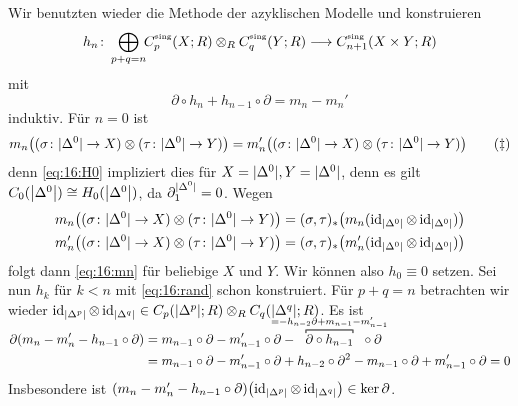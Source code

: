 \begin{beweis}
	Wir benutzten wieder die Methode der azyklischen Modelle und konstruieren
	\[
		h_n \colon \bigoplus_{p+q=n}\!\! C^\sing_p(X;R) \otimes_R C^\sing_q(Y;R) \longrightarrow C_{n+1}^\sing(X \times Y;R)
	\]
	mit 
	\begin{equation}
		\partial \circ h_n + h_{n-1} \circ \partial=m_n -m_n' \label{eq:16:rand} \tag{\#}
	\end{equation}
	induktiv. Für $n=0$ ist 
	\begin{equation}
		m_n \enbrace[\big]{(\sigma \colon \abs{\Delta^0} \to X) \otimes (\tau \colon \abs{\Delta^0} \to Y ) } = m_n' \enbrace[\big]{(\sigma \colon \abs{\Delta^0} \to X) \otimes (\tau \colon \abs{\Delta^0} \to Y)} \label{eq:16:mn}\tag{\ddag}
	\end{equation}
	denn \eqref{eq:16:H0} impliziert dies für $X=\abs{\Delta^0}, Y=\abs{\Delta^0}$, denn es gilt $C_0(\abs*{\Delta^0})\cong H_0(\abs*{\Delta^0})$, da $\partial_1^{\abs{\Delta^0} }=0$. Wegen
	\begin{align}
		m_n \enbrace[\big]{(\sigma \colon \abs{\Delta^0} \to X) \otimes (\tau \colon \abs{\Delta^0} \to Y)} &= (\sigma,\tau)_* \enbrace[\big]{m_n \enbrace{\id_{\abs*{\Delta^0} } \otimes \id_{\abs*{\Delta^0}}}}\\
		m_n' \enbrace[\big]{(\sigma \colon \abs{\Delta^0} \to X) \otimes (\tau \colon \abs{\Delta^0} \to Y)} &= (\sigma,\tau)_* \enbrace[\big]{m_n' \enbrace{\id_{\abs*{\Delta^0} } \otimes \id_{\abs*{\Delta^0}}}}
	\end{align}
	folgt dann \eqref{eq:16:mn} für beliebige $X$ und $Y$.
	Wir können also $h_0 \equiv 0$ setzen.
	Sei nun $h_k$ für $k < n$ mit \eqref{eq:16:rand} schon konstruiert.
	Für $p+q=n$ betrachten wir wieder $\id_{\abs*{\Delta^p}} \otimes \id_{\abs*{\Delta^q}} \in C_p \enbrace*{\abs*{\Delta^p};R} \otimes_R C_q \enbrace*{\abs*{\Delta^q};R }$.
	Es ist 
	\begin{align}
		\SwapAboveDisplaySkip
		\partial \enbrace*{m_n -m'_n - h_{n-1} \circ \partial} &= m_{n-1} \circ \partial -m_{n-1}' \circ \partial - \hspace{-2em}\Overbracket{\partial \circ h_{n-1}}{= - h_{n-2} \partial + m_{n-1} - m_{n-1}'} \hspace{-2em} \circ \partial \\
		&= m_{n-1} \circ \partial - m_{n-1}' \circ \partial + h_{n-2} \circ \partial^2 - m_{n-1} \circ \partial + m_{n-1}' \circ \partial =0
	\end{align}
	Insbesondere ist $\enbrace*{m_n -m_n' - h_{n-1} \circ \partial} \enbrace*{\id_{\abs*{\Delta^p}} \otimes \id_{\abs*{\Delta^q} }} \in \ker \partial$.

\end{beweis}
